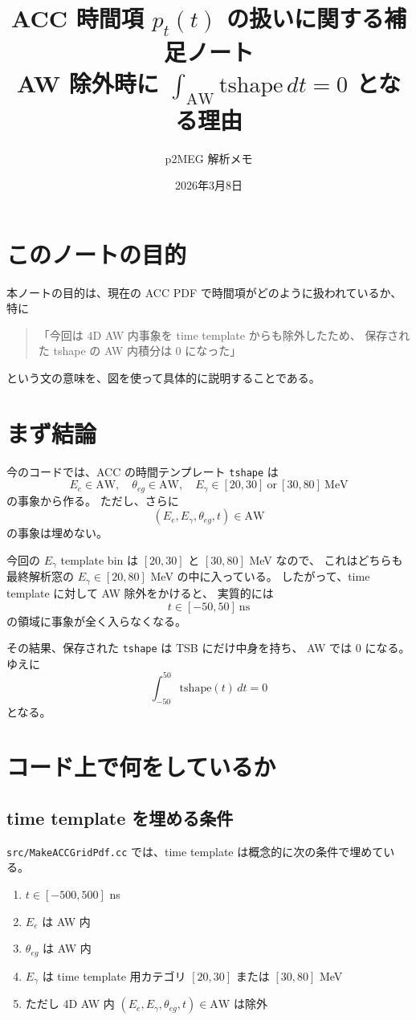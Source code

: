 \documentclass[a4paper,11pt]{jsarticle}
\title{ACC 時間項 \(p_t(t)\) の扱いに関する補足ノート\\
AW 除外時に \(\int_{\mathrm{AW}} \mathrm{tshape}\,dt = 0\) となる理由}
\author{p2MEG 解析メモ}
\date{2026年3月8日}
\begin{document}
\maketitle

\section{このノートの目的}
本ノートの目的は、現在の ACC PDF で時間項がどのように扱われているか、
特に
\begin{quote}
「今回は 4D AW 内事象を time template からも除外したため、
保存された tshape の AW 内積分は 0 になった」
\end{quote}
という文の意味を、図を使って具体的に説明することである。

\section{まず結論}
今のコードでは、ACC の時間テンプレート \texttt{tshape} は
\[
E_e \in \mathrm{AW},\quad
\theta_{eg}\in \mathrm{AW},\quad
E_\gamma \in [20,30]\ \text{or}\ [30,80]\ \mathrm{MeV}
\]
の事象から作る。
ただし、さらに
\[
(E_e,E_\gamma,\theta_{eg},t)\in \mathrm{AW}
\]
の事象は埋めない。

今回の \(E_\gamma\) template bin は \([20,30]\) と \([30,80]\) MeV なので、
これはどちらも最終解析窓の \(E_\gamma\in[20,80]\) MeV の中に入っている。
したがって、time template に対して AW 除外をかけると、
実質的には
\[
t\in[-50,50]\ \mathrm{ns}
\]
の領域に事象が全く入らなくなる。

その結果、保存された \texttt{tshape} は TSB にだけ中身を持ち、
AW では 0 になる。
ゆえに
\[
\int_{-50}^{50} \mathrm{tshape}(t)\,dt = 0
\]
となる。

\section{コード上で何をしているか}
\subsection{time template を埋める条件}
\texttt{src/MakeACCGridPdf.cc} では、time template は概念的に次の条件で埋めている。
\begin{enumerate}
  \item \(t \in [-500,500]\) ns
  \item \(E_e\) は AW 内
  \item \(\theta_{eg}\) は AW 内
  \item \(E_\gamma\) は time template 用カテゴリ \([20,30]\) または \([30,80]\) MeV
  \item ただし 4D AW 内 \((E_e,E_\gamma,\theta_{eg},t)\in\mathrm{AW}\) は除外
\end{enumerate}
\end{document}
